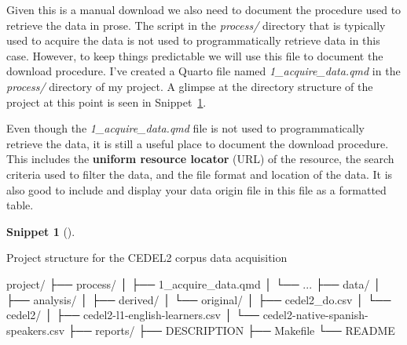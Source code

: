 \documentclass[
  letterpaper,
  krantz1]{latex/krantz-mod}
\newenvironment{Shaded}{\begin{snugshade}}{\end{snugshade}}
\newcommand{\ExtensionTok}[1]{\textcolor[rgb]{0.00,0.00,0.00}{#1}}
\newcommand{\NormalTok}[1]{\textcolor[rgb]{0.00,0.00,0.00}{#1}}
\theoremstyle{definition}
\newtheorem{definition}{Snippet}[chapter]
\theoremstyle{definition}
\theoremstyle{remark}
\begin{document}
Given this is a manual download we also need to document the procedure
used to retrieve the data in prose. The script in the \emph{process/}
directory that is typically used to acquire the data is not used to
programmatically retrieve data in this case.
However, to keep things predictable we will use this file to document
the download procedure. I've created a Quarto file named
\emph{1\_acquire\_data.qmd} in the \emph{process/} directory of my
project. A glimpse at the directory structure of the project at this
point is seen in Snippet~\ref{def-acquire-cedel2-structure}.

Even though the \emph{1\_acquire\_data.qmd} file is not used to
programmatically retrieve the data, it is still a useful place to
document the download procedure. This includes the \textbf{uniform
resource locator} (URL) of the
resource, the search criteria used to filter the data, and the file
format and location of the data. It is also good to include and display
your data origin file in this file as a formatted table.

\pagebreak

\begin{definition}[]\protect\hypertarget{def-acquire-cedel2-structure}{}\label{def-acquire-cedel2-structure}

Project structure for the CEDEL2 corpus data acquisition

\begin{Shaded}
\begin{Highlighting}[]
\ExtensionTok{project/}
\ExtensionTok{├──}\NormalTok{ process/}
\ExtensionTok{│}\NormalTok{   ├── 1\_acquire\_data.qmd}
\ExtensionTok{│}\NormalTok{   └── ...}
\ExtensionTok{├──}\NormalTok{ data/}
\ExtensionTok{│}\NormalTok{   ├── analysis/}
\ExtensionTok{│}\NormalTok{   ├── derived/}
\ExtensionTok{│}\NormalTok{   └── original/}
\ExtensionTok{│}\NormalTok{       ├── cedel2\_do.csv}
\ExtensionTok{│}\NormalTok{       └── cedel2/}
\ExtensionTok{│}\NormalTok{           ├── cedel2{-}l1{-}english{-}learners.csv}
\ExtensionTok{│}\NormalTok{           └── cedel2{-}native{-}spanish{-}speakers.csv}
\ExtensionTok{├──}\NormalTok{ reports/}
\ExtensionTok{├──}\NormalTok{ DESCRIPTION}
\ExtensionTok{├──}\NormalTok{ Makefile}
\ExtensionTok{└──}\NormalTok{ README}
\end{Highlighting}
\end{Shaded}

\end{definition}
\end{document}
